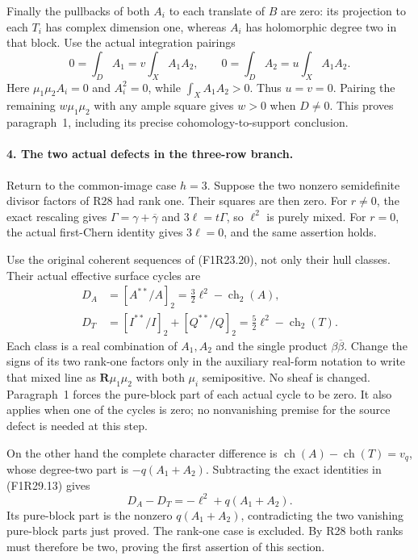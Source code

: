 Finally the pullbacks of both $A_i$ to
each translate of $B$ are zero: its
projection to each $T_i$ has complex
dimension one, whereas $A_i$ has
holomorphic degree two in that block.
Use the actual integration pairings
\[
 0=\int_D A_1=v\int_X A_1A_2,
       \qquad
 0=\int_D A_2=u\int_X A_1A_2.
 \tag{F1R29.12}
\]
Here $\mu_1\mu_2 A_i=0$ and $A_i^2=0$,
while $\int_XA_1A_2>0$.
Thus $u=v=0$. Pairing the remaining
$w\mu_1\mu_2$ with any ample square
gives $w>0$ when $D\ne0$.
This proves paragraph~1, including its
precise cohomology-to-support conclusion.

\paragraph{4. The two actual defects in the three-row branch.}
Return to the common-image case $h=3$.
Suppose the two nonzero semidefinite
divisor factors of R28 had rank one.
Their squares are then zero.
For $r\ne0$, the exact rescaling gives
$\Gamma=\gamma+\overline\gamma$ and
$3\ell=t\Gamma$, so $\ell^2$ is purely
mixed. For $r=0$, the actual first-Chern
identity gives $3\ell=0$, and the same
assertion holds.

Use the original coherent sequences of
(F1R23.20), not only their hull classes.
Their actual effective surface cycles are
\[
 \begin{split}
 D_A&=[A^{**}/A]_2
                =\tfrac32\ell^2-\operatorname{ch}_2(A),\\
 D_T&=[I^{**}/I]_2+[Q^{**}/Q]_2
                =\tfrac52\ell^2-\operatorname{ch}_2(T).
 \end{split}
 \tag{F1R29.13}
\]
Each class is a real combination of
$A_1,A_2$ and the single product
$\beta\overline\beta$. Change the signs
of its two rank-one factors only in
the auxiliary real-form notation to
write that mixed line as
$\mathbf R\mu_1\mu_2$ with both $\mu_i$
semipositive. No sheaf is changed.
Paragraph~1 forces the pure-block part
of each actual cycle to be zero.
It also applies when one of the cycles
is zero; no nonvanishing premise for
the source defect is needed at this step.

On the other hand the complete character
difference is $\operatorname{ch}(A)-
\operatorname{ch}(T)=v_q$, whose
degree-two part is $-q(A_1+A_2)$.
Subtracting the exact identities in
(F1R29.13) gives
\[
                   D_A-D_T=-\ell^2+q(A_1+A_2).
 \tag{F1R29.14}
\]
Its pure-block part is the nonzero
$q(A_1+A_2)$, contradicting the two
vanishing pure-block parts just proved.
The rank-one case is excluded. By R28
both ranks must therefore be two,
proving the first assertion of this section.

